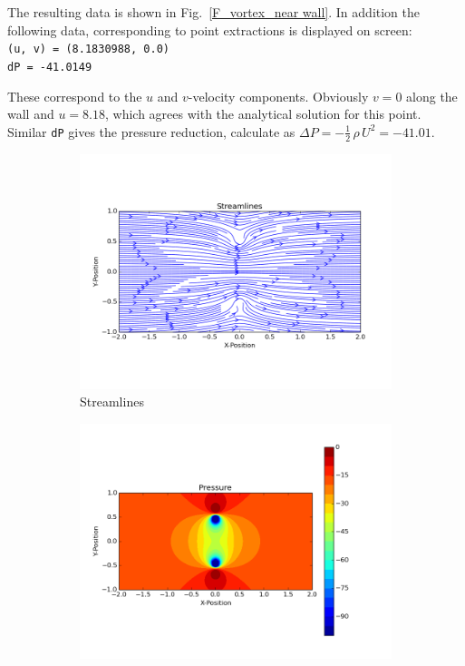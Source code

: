 \documentclass[10pt,a4paper]{article}
\begin{document}
The resulting data is shown in Fig.~\ref{F_vortex_near wall}. 
In addition the following data, corresponding to point extractions is displayed on screen: \\
\verb'(u, v) = (8.1830988, 0.0)' \\
\verb'dP = -41.0149'

These correspond to the $u$ and $v$-velocity components. 
Obviously $v=0$ along the wall and $u=8.18$, which agrees with the analytical solution for this point.  
Similar \verb'dP' gives the pressure reduction, calculate as $\Delta P = - \frac{1}{2} \, \rho \, U^2 = -41.01$. 


\begin{figure}
\centering
\begin{subfigure}{0.48\textwidth}
    \includegraphics[width=1.0\textwidth]{Figures/Vortex_wall_SL}
  \caption{Streamlines}
\end{subfigure}
\hfill
\begin{subfigure}{0.48\textwidth}
    \includegraphics[width=1.0\textwidth]{Figures/Vortex_wall_pressure}

\end{subfigure}
\end{figure}
\end{document}
